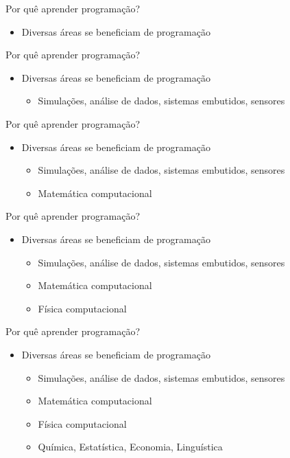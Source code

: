 \documentclass[t, aspectratio=169]{beamer}
\begin{document}
\begin{frame}[label={sec:org302879b}]{Por quê aprender programação?}
\begin{itemize}
\item Diversas áreas se beneficiam de programação
\end{itemize}
\end{frame}

\begin{frame}[label={sec:orgba4fdea}]{Por quê aprender programação?}
\begin{itemize}
\item Diversas áreas se beneficiam de programação
\begin{itemize}
\item Simulações, análise de dados, sistemas embutidos, sensores
\end{itemize}
\end{itemize}
\end{frame}

\begin{frame}[label={sec:orge217b59}]{Por quê aprender programação?}
\begin{itemize}
\item Diversas áreas se beneficiam de programação
\begin{itemize}
\item Simulações, análise de dados, sistemas embutidos, sensores
\item Matemática computacional
\end{itemize}
\end{itemize}
\end{frame}

\begin{frame}[label={sec:org4d55f85}]{Por quê aprender programação?}
\begin{itemize}
\item Diversas áreas se beneficiam de programação
\begin{itemize}
\item Simulações, análise de dados, sistemas embutidos, sensores
\item Matemática computacional
\item Física computacional
\end{itemize}
\end{itemize}
\end{frame}

\begin{frame}[label={sec:org593529c}]{Por quê aprender programação?}
\begin{itemize}
\item Diversas áreas se beneficiam de programação
\begin{itemize}
\item Simulações, análise de dados, sistemas embutidos, sensores
\item Matemática computacional
\item Física computacional
\item Química, Estatística, Economia, Linguística
\end{itemize}
\end{itemize}
\end{frame}
\end{document}
